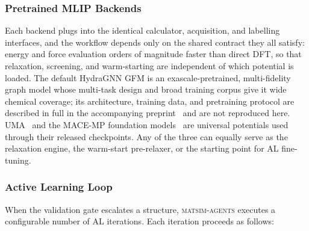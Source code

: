 \documentclass[conference]{IEEEtran}
\def\ac#1{#1}%
\def\acs#1{#1}%
\begin{document}
\subsubsection{Pretrained MLIP Backends}
Each backend plugs into the identical calculator, acquisition, and labelling
interfaces, and the workflow depends only on the shared contract they all
satisfy: energy and force evaluation orders of magnitude faster than direct
\acs{DFT}, so that relaxation, screening, and warm-starting are independent of
which potential is loaded. The default HydraGNN \ac{GFM} is an
exascale-pretrained, multi-fidelity graph model whose multi-task design and
broad training corpus give it wide chemical coverage; its architecture, training
data, and pretraining protocol are described in full in the accompanying
preprint~\cite{lupopasini2026exascalegfm} and are not reproduced here.
UMA~\cite{wood2025uma} and the MACE-MP foundation
models~\cite{batatia2022,batatia2023macemp} are universal potentials used
through their released checkpoints. Any of the three can equally serve as the
relaxation engine, the warm-start pre-relaxer, or the starting point for
\acs{AL} fine-tuning.

\subsubsection{Active Learning Loop}
When the validation gate escalates a structure, \textsc{matsim-agents} executes a configurable
number of \acs{AL} iterations. Each iteration proceeds as follows:
\end{document}
